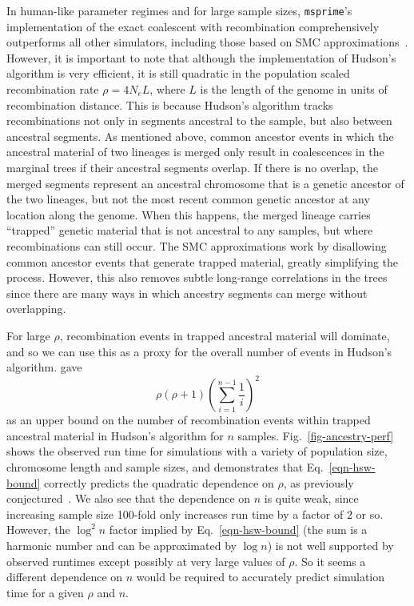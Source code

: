 \documentclass{article}
\newcommand{\msprime}[0]{\texttt{msprime}}
\begin{document}
In human-like parameter regimes and for large sample sizes,
\msprime's implementation of the
exact coalescent with recombination comprehensively outperforms
all other simulators, including those based on SMC
approximations~\citep{kelleher2016efficient}. However, it is important
to note that although the implementation of Hudson's algorithm is
very efficient, it is still quadratic in the population scaled recombination rate
$\rho = 4 N_e L$, where $L$ is the length of the genome in units of recombination distance.
This is because Hudson's algorithm tracks recombinations not only
in segments ancestral to the sample, but also between ancestral segments.
As mentioned above, common ancestor events in which the ancestral material
of two lineages is merged only result in coalescences in the marginal trees
if their ancestral segments overlap. If there is no overlap, the merged
segments represent an ancestral chromosome that is a genetic ancestor
of the two lineages, but not the most recent common genetic ancestor
at any location along the genome.
When this happens, the merged lineage carries ``trapped'' genetic material
that is not ancestral to any samples, but where recombinations can still occur.
The SMC approximations work by disallowing common ancestor events
that generate trapped material, greatly simplifying the process.
However, this also removes subtle long-range
correlations in the trees since there are many ways in which ancestry
segments can merge without overlapping.

For large $\rho$, recombination events in trapped ancestral material will
dominate, and so we can use this as a proxy for the overall number
of events in Hudson's algorithm.
\citet[Eq.~5.10]{hein2004gene} gave
\begin{equation}\label{eqn-hsw-bound}
\rho (\rho + 1) \left( \sum_{i=1}^{n-1} \frac{1}{i} \right)^2
\end{equation}
as an upper bound
on the number of recombination events within trapped ancestral material
in Hudson's algorithm for $n$ samples.
Fig.~\ref{fig-ancestry-perf} shows the observed run time for
simulations with a variety of population size, chromosome
length and sample sizes, and demonstrates that Eq.~\eqref{eqn-hsw-bound}
correctly predicts the quadratic dependence on $\rho$,
as previously conjectured~\citep[Fig.~2]{kelleher2016efficient}.
We also see that the dependence on $n$ is quite weak,
since increasing sample size 100-fold
only increases run time by a factor of 2 or so. However, the
$\log^2{n}$ factor implied by Eq.~\eqref{eqn-hsw-bound}
(the sum is a harmonic number and can be approximated by $\log{n}$)
is not well supported by observed runtimes except possibly at very
large values of $\rho$. So it seems a different dependence
on $n$ would be required to accurately predict simulation time for a
given $\rho$ and $n$.
\end{document}
